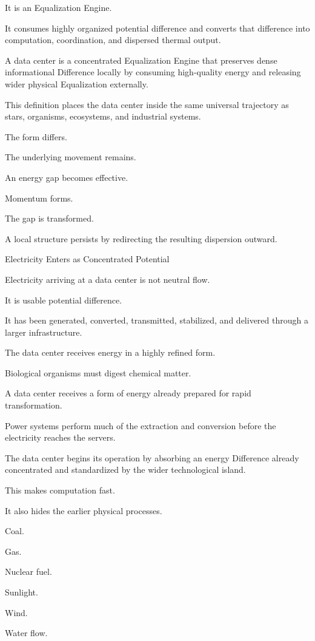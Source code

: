 It is an Equalization Engine.

It consumes highly organized potential difference and converts that difference into computation, coordination, and dispersed thermal output.

A data center is a concentrated Equalization Engine that preserves dense informational Difference locally by consuming high-quality energy and releasing wider physical Equalization externally.

This definition places the data center inside the same universal trajectory as stars, organisms, ecosystems, and industrial systems.

The form differs.

The underlying movement remains.

An energy gap becomes effective.

Momentum forms.

The gap is transformed.

A local structure persists by redirecting the resulting dispersion outward.

Electricity Enters as Concentrated Potential

Electricity arriving at a data center is not neutral flow.

It is usable potential difference.

It has been generated, converted, transmitted, stabilized, and delivered through a larger infrastructure.

The data center receives energy in a highly refined form.

Biological organisms must digest chemical matter.

A data center receives a form of energy already prepared for rapid transformation.

Power systems perform much of the extraction and conversion before the electricity reaches the servers.

The data center begins its operation by absorbing an energy Difference already concentrated and standardized by the wider technological island.

This makes computation fast.

It also hides the earlier physical processes.

Coal.

Gas.

Nuclear fuel.

Sunlight.

Wind.

Water flow.

